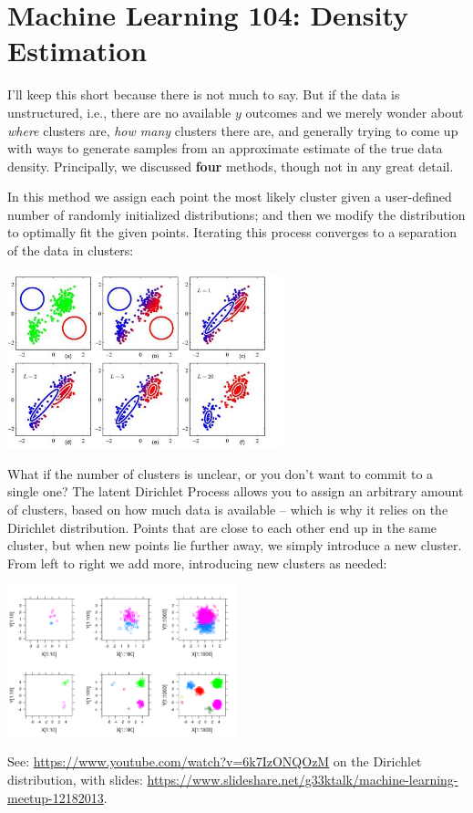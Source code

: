 \documentclass{article}
\begin{document}

\section{Machine Learning 104: Density Estimation}
I'll keep this short because there is not much to say. But if the data is unstructured, i.e., there are no available $y$ outcomes and we merely wonder about \textit{where} clusters are, \textit{how many} clusters there are, and generally trying to come up with ways to generate samples from an approximate estimate of the true data density. Principally, we discussed \textbf{four} methods, though not in any great detail.
\begin{spexample}
    In this method we assign each point the most likely cluster given a user-defined number of randomly initialized distributions; and then we modify the distribution to optimally fit the given points. Iterating this process converges to a separation of the data in clusters:
    \begin{center}\includegraphics[width=0.6\textwidth]{expectation-maximization.jpg}\end{center}
\end{spexample}
\begin{spexample}
    What if the number of clusters is unclear, or you don't want to commit to a single one? The latent Dirichlet Process allows you to assign an arbitrary amount of clusters, based on how much data is available -- which is why it relies on the Dirichlet distribution. Points that are close to each other end up in the same cluster, but when new points lie further away, we simply introduce a new cluster. From left to right we add more, introducing new clusters as needed:
    \begin{center}\includegraphics[width=0.5\textwidth,trim={0cm 0cm 0cm 7cm},clip]{DP_clustering_simulation.png}\end{center}
    See: \url{https://www.youtube.com/watch?v=6k7IzONQOzM} on the Dirichlet distribution, with slides: \url{https://www.slideshare.net/g33ktalk/machine-learning-meetup-12182013}.
\end{spexample}
\end{document}
